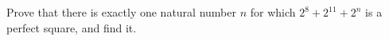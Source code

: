 Prove that there is exactly one natural number $n$ for which $2^8+2^{11}+2^n$ is a perfect square, and find it.
